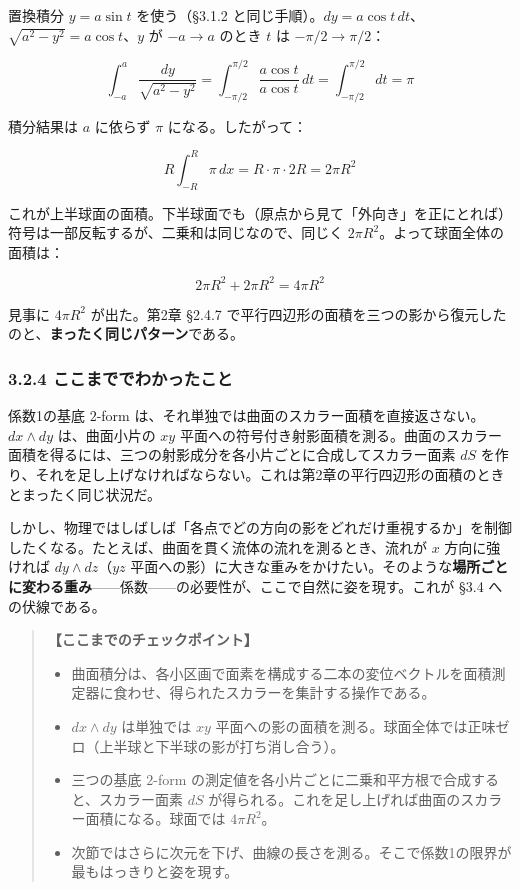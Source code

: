 \documentclass[a4paper,12pt,openany]{book}
\begin{document}
置換積分 \(y = a\sin t\) を使う（§3.1.2
と同じ手順）。\(dy = a\cos t\,dt\)、\(\sqrt{a^2 - y^2} = a\cos t\)、\(y\)
が \(-a \to a\) のとき \(t\) は \(-\pi/2 \to \pi/2\)：

\[\int_{-a}^{a} \frac{dy}{\sqrt{a^2 - y^2}} = \int_{-\pi/2}^{\pi/2} \frac{a\cos t}{a\cos t}\,dt = \int_{-\pi/2}^{\pi/2} dt = \pi\]

積分結果は \(a\) に依らず \(\pi\) になる。したがって：

\[R\int_{-R}^{R} \pi\,dx = R \cdot \pi \cdot 2R = 2\pi R^2\]

これが上半球面の面積。下半球面でも（原点から見て「外向き」を正にとれば）符号は一部反転するが、二乗和は同じなので、同じく
\(2\pi R^2\)。よって球面全体の面積は：

\[2\pi R^2 + 2\pi R^2 = 4\pi R^2\]

見事に \(4\pi R^2\) が出た。第2章 §2.4.7
で平行四辺形の面積を三つの影から復元したのと、\textbf{まったく同じパターン}である。

\hypertarget{ux3053ux3053ux307eux3067ux3067ux308fux304bux3063ux305fux3053ux3068}{%
\subsubsection{3.2.4
ここまででわかったこと}\label{ux3053ux3053ux307eux3067ux3067ux308fux304bux3063ux305fux3053ux3068}}

係数1の基底 \(2\)-form
は、それ単独では曲面のスカラー面積を直接返さない。\(dx \wedge dy\)
は、曲面小片の \(xy\)
平面への符号付き射影面積を測る。曲面のスカラー面積を得るには、三つの射影成分を各小片ごとに合成してスカラー面素
\(dS\)
を作り、それを足し上げなければならない。これは第2章の平行四辺形の面積のときとまったく同じ状況だ。

しかし、物理ではしばしば「各点でどの方向の影をどれだけ重視するか」を制御したくなる。たとえば、曲面を貫く流体の流れを測るとき、流れが
\(x\) 方向に強ければ \(dy \wedge dz\)（\(yz\)
平面への影）に大きな重みをかけたい。そのような\textbf{場所ごとに変わる重み}——係数——の必要性が、ここで自然に姿を現す。これが
§3.4 への伏線である。

\begin{quote}
\textbf{【ここまでのチェックポイント】}

\begin{itemize}
\item
  曲面積分は、各小区画で面素を構成する二本の変位ベクトルを面積測定器に食わせ、得られたスカラーを集計する操作である。
\item
  \(dx \wedge dy\) は単独では \(xy\)
  平面への影の面積を測る。球面全体では正味ゼロ（上半球と下半球の影が打ち消し合う）。
\item
  三つの基底 \(2\)-form
  の測定値を各小片ごとに二乗和平方根で合成すると、スカラー面素 \(dS\)
  が得られる。これを足し上げれば曲面のスカラー面積になる。球面では
  \(4\pi R^2\)。
\item
  次節ではさらに次元を下げ、曲線の長さを測る。そこで係数1の限界が最もはっきりと姿を現す。
\end{itemize}
\end{quote}
\end{document}
